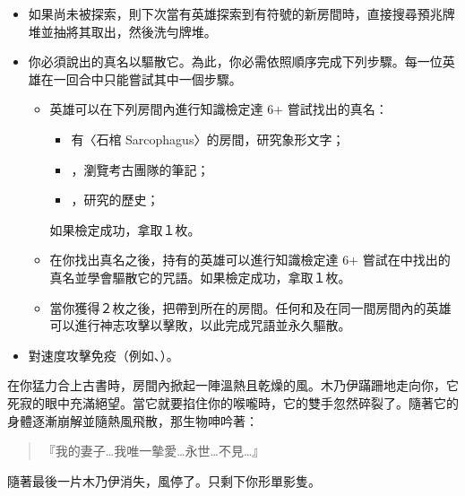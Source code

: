 \vspace*{-1em}
\begin{itemize}
	\item 如果尚未被探索，則下次當有英雄探索到有\OmenSymbol{}符號的新房間時，直接搜尋預兆牌堆並抽將其取出，然後洗勻牌堆。
	\item 你必須說出的真名以驅散它。為此，你必需依照順序完成下列步驟。每一位英雄在一回合中只能嘗試其中一個步驟。
	      \begin{itemize}
		      \item 英雄可以在下列房間內進行知識檢定達 6+ 嘗試找出的真名：
		            \begin{itemize}
			            \item 有〈石棺 Sarcophagus〉的房間，研究象形文字；
			            \item {}，瀏覽考古團隊的筆記；
			            \item {}，研究的歷史；
		            \end{itemize}
		            如果檢定成功，拿取１枚。
		      \item 在你找出真名之後，持有的英雄可以進行知識檢定達 6+ 嘗試在中找出的真名並學會驅散它的咒語。如果檢定成功，拿取１枚。
		      \item 當你獲得２枚之後，把帶到所在的房間。任何和及在同一間房間內的英雄可以進行神志攻擊以擊敗，以此完成咒語並永久驅散。
	      \end{itemize}
	\item {}對速度攻擊免疫（例如、）。
\end{itemize}

\begin{HauntStory}
	在你猛力合上古書時，房間內掀起一陣溫熱且乾燥的風。木乃伊蹣跚地走向你，它死寂的眼中充滿絕望。當它就要掐住你的喉嚨時，它的雙手忽然碎裂了。隨著它的身體逐漸崩解並隨熱風飛散，那生物呻吟著：
	\begin{quote}
		『我的妻子…我唯一摰愛…永世…不見…』
	\end{quote}
	隨著最後一片木乃伊消失，風停了。只剩下你形單影隻。
\end{HauntStory}
